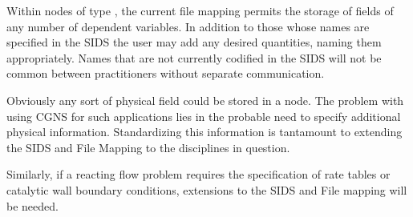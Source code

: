Within nodes of type , the current file mapping
permits the storage of fields of any number of dependent variables.
In addition to those whose names are specified in the SIDS the user may
add any desired quantities, naming them appropriately.
Names that are not currently codified in the SIDS will not be
common between practitioners without separate communication.

Obviously any sort of physical field could be stored in a
 node.
The problem with using CGNS for such applications lies in the probable
need to specify additional physical information.
Standardizing this information is tantamount to extending the SIDS and
File Mapping to the disciplines in question.

Similarly, if a reacting flow problem requires the specification of rate
tables or catalytic wall boundary conditions, extensions to the SIDS and
File mapping will be needed.
